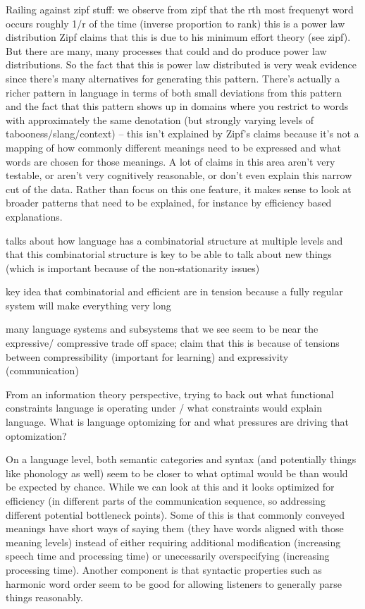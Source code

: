 \documentclass[]{article}
\begin{document}
Railing against zipf stuff: \cite{piantadosi2014} we observe from zipf that the rth most frequenyt word occurs roughly 1/r of the time (inverse proportion to rank) this is a power law distribution 
Zipf claims that this is due to his minimum effort theory (see zipf). But there are many, many processes that could and do produce power law distributions. So the fact that this is power law distributed is very weak evidence since there's many alternatives for generating this pattern. There's actually a richer pattern in language in terms of both small deviations from this pattern and the fact that this pattern shows up in domains where you restrict to words with approximately the same denotation (but strongly varying levels of tabooness/slang/context) -- this isn't explained by Zipf's claims because it's not a mapping of how commonly different meanings need to be expressed and what words are chosen for those meanings. A lot of claims in this area aren't very testable, or aren't very cognitively reasonable, or don't even explain this narrow cut of the data. Rather than focus on this one feature, it makes sense to look at broader patterns that need to be explained, for instance by efficiency based explanations. 

\cite{kirby2015} talks about how language has a combinatorial structure at multiple levels and that this combinatorial structure is key to be able to talk about new things (which is important because of the non-stationarity issues) 

\cite{kirby2015} key idea that combinatorial and efficient are in tension because a fully regular system will make everything very long

\cite{kirby2015} many language systems and subsystems that we see seem to be near the expressive/ compressive trade off space; claim that this is because of tensions between compressibility (important for learning) and expressivity (communication) 

\cite{futrell2022} From an information theory perspective, trying to back out what functional constraints language is operating under / what constraints would explain language. What is language optomizing for and what pressures are driving that optomization? 

On a language level, both semantic categories and syntax (and potentially things like phonology as well) seem to be closer to what optimal would be than would be expected by chance. While we can look at this and it looks optimized for efficiency (in different parts of the communication sequence, so addressing different potential bottleneck points). Some of this is that commonly conveyed meanings have short ways of saying them (they have words aligned with those meaning levels) instead of either requiring additional modification (increasing speech time and processing time) or unecessarily overspecifying (increasing processing time). Another component is that syntactic properties such as harmonic word order seem to be good for allowing listeners to generally parse things reasonably. 
\end{document}
